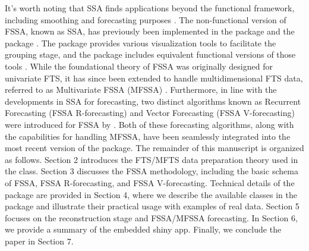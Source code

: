 It's worth noting that SSA finds applications beyond the functional framework, including smoothing and forecasting purposes \citep{hassani2013, deCarvalho2017realtime}. The non-functional version of FSSA, known as SSA, has previously been implemented in the  package \citep{rssapackage} and the  package \citep{ASSApackage}.
The  package provides various visualization tools to facilitate the grouping stage, and the  package includes equivalent functional versions of those tools \citep{golyandina2018singular}. While the foundational theory of FSSA was originally designed for univariate FTS, it has since been extended to handle multidimensional FTS data, referred to as Multivariate FSSA (MFSSA) \citep{trinka2022multivariate}. Furthermore, in line with the developments in SSA for forecasting, two distinct algorithms known as Recurrent Forecasting (FSSA R-forecasting) and Vector Forecasting (FSSA V-forecasting) were introduced for FSSA by \cite{trinka2023functional}. Both of these forecasting algorithms, along with the capabilities for handling MFSSA, have been seamlessly integrated into the most recent version of the  package.
The remainder of this manuscript is organized as follows. Section 2 introduces the FTS/MFTS data preparation theory used in the  class. Section 3 discusses the FSSA methodology, including the basic schema of FSSA, FSSA R-forecasting, and FSSA V-forecasting. Technical details of the  package are provided in Section 4, where we describe the available classes in the package and illustrate their practical usage with examples of real data. Section 5 focuses on the reconstruction stage and FSSA/MFSSA forecasting. In Section 6, we provide a summary of the embedded shiny app. Finally, we conclude the paper in Section 7.
